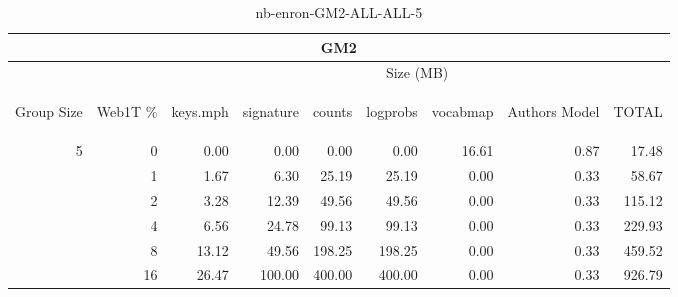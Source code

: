 \begin{center}
\begin{table}[htbp]
\begin{tabular}{ | r | r | r | r | r | r | r | r | r |}
\hline
\multicolumn{9}{|c|}{GM2}\\
\hline
 & & \multicolumn{7}{|c|}{Size (MB)}\\ \cline{3-9}
\begin{sideways}Group Size\end{sideways} & \begin{sideways}Web1T \% \end{sideways} & \begin{sideways}keys.mph\end{sideways} & \begin{sideways}signature\end{sideways} & \begin{sideways}counts\end{sideways} & \begin{sideways}logprobs\end{sideways} & \begin{sideways}vocabmap\end{sideways} & \begin{sideways}Authors Model \end{sideways} & \begin{sideways}TOTAL\end{sideways}\\
\hline
\multirow{5}{*}{5}
 & 0 & 0.00 & 0.00 & 0.00 & 0.00 & 16.61 & 0.87 & 17.48\\ \cline{2-9}
 & 1 & 1.67 & 6.30 & 25.19 & 25.19 & 0.00 & 0.33 & 58.67\\ \cline{2-9}
 & 2 & 3.28 & 12.39 & 49.56 & 49.56 & 0.00 & 0.33 & 115.12\\ \cline{2-9}
 & 4 & 6.56 & 24.78 & 99.13 & 99.13 & 0.00 & 0.33 & 229.93\\ \cline{2-9}
 & 8 & 13.12 & 49.56 & 198.25 & 198.25 & 0.00 & 0.33 & 459.52\\ \cline{2-9}
 & 16 & 26.47 & 100.00 & 400.00 & 400.00 & 0.00 & 0.33 & 926.79\\ \cline{2-9}
\hline
\end{tabular}
\caption{nb-enron-GM2-ALL-ALL-5}
\label{table:nb-enron-GM2-ALL-ALL-5}
\end{table}
\end{center}

